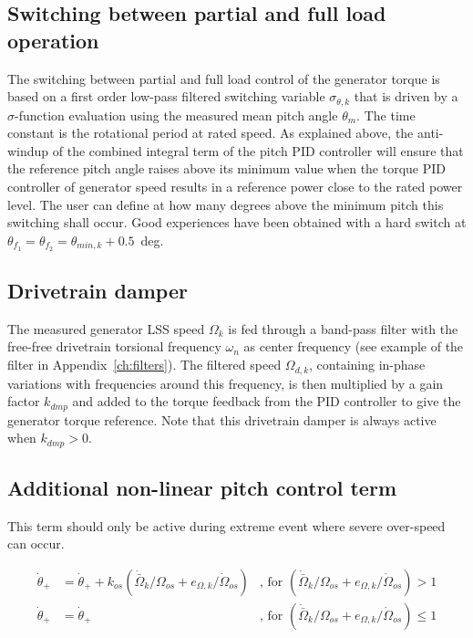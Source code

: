 \subsection{Switching between partial and full load operation}

The switching between partial and full load control of the generator torque is based on a first order low-pass filtered switching variable $\sigma_{\theta,k}$ that is driven by a $\sigma$-function evaluation using the measured mean pitch angle $\theta_m$. The time constant is the rotational period at rated speed. As explained above, the anti-windup of the combined integral term of the pitch PID controller will ensure that the reference pitch angle raises above its minimum value when the torque PID controller of generator speed results in a reference power close to the rated power level. The user can define at how many degrees above the minimum pitch this switching shall occur. Good experiences have been obtained with a hard switch at $\theta_{f_1}=\theta_{f_2}=\theta_{min,k}+0.5$~deg.

\subsection{Drivetrain damper}\label{s:dmp}

The measured generator LSS speed $\Omega_k$ is fed through a band-pass filter with the free-free drivetrain torsional frequency $\omega_n$ as center frequency (see example of the filter in Appendix~\ref{ch:filters}). The filtered speed $\Omega_{d,k}$, containing in-phase variations with frequencies around this frequency, is then multiplied by a gain factor $k_{dmp}$ and added to the torque feedback from the PID controller to give the generator torque reference. Note that this drivetrain damper is always active when $k_{dmp}>0$.

\subsection{Additional non-linear pitch control term}

This term should only be active during extreme event where severe over-speed can occur.

\begin{align}
	\dot{\theta}_{+} &= \dot{\theta}_{+} + k_{os} ( \dot{\bar{\Omega}}_k/\Omega_{os} + e_{\Omega,k}/\dot{\Omega}_{os} ) &\text{, for } ( \dot{\bar{\Omega}}_k/\Omega_{os} + e_{\Omega,k}/\dot{\Omega}_{os} ) > 1 \\
	\dot{\theta}_{+} &= \dot{\theta}_{+} &\text{, for } ( \dot{\bar{\Omega}}_k/\Omega_{os} + e_{\Omega,k}/\dot{\Omega}_{os} ) \leq 1	
\end{align}


